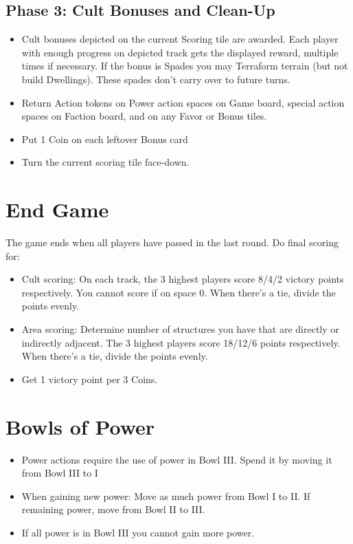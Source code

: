 \documentclass[12pt]{article}
\newenvironment{itemizeCustom}
{\begin{itemize}
  \setlength{\itemsep}{1pt}
  \setlength{\parskip}{0pt}
  \setlength{\parsep}{0pt}}
{\end{itemize}}
\begin{document}
\begin{multicols*}{2}
\subsection*{Phase 3: Cult Bonuses and Clean-Up}
\begin{itemizeCustom}
    \item Cult bonuses depicted on the current Scoring tile are awarded. Each player with enough progress on depicted track gets the displayed reward, multiple times if necessary. If the bonus is Spades you may Terraform terrain (but not build Dwellings). These spades don't carry over to future turns.
    \item Return Action tokens on Power action spaces on Game board, special action spaces on Faction board, and on any Favor or Bonus tiles.
    \item Put 1 Coin on each leftover Bonus card
    \item Turn the current scoring tile face-down.
\end{itemizeCustom}

\section*{End Game}
The game ends when all players have passed in the last round. Do final scoring for:
\begin{itemizeCustom}
    \item Cult scoring: On each track, the 3 highest players score 8/4/2 victory points respectively. You cannot score if on space 0. When there's a tie, divide the points evenly.
    \item Area scoring: Determine number of structures you have that are directly or indirectly adjacent. The 3 highest players score 18/12/6 points respectively. When there's a tie, divide the points evenly.
    \item Get 1 victory point per 3 Coins.
\end{itemizeCustom}

\section*{Bowls of Power}
\begin{itemizeCustom}
    \item Power actions require the use of power in Bowl III. Spend it by moving it from Bowl III to I
    \item When gaining new power: Move as much power from Bowl I to II. If remaining power, move from Bowl II to III.
    \item If all power is in Bowl III you cannot gain more power.
\end{itemizeCustom}


\end{multicols*}
\end{document}
